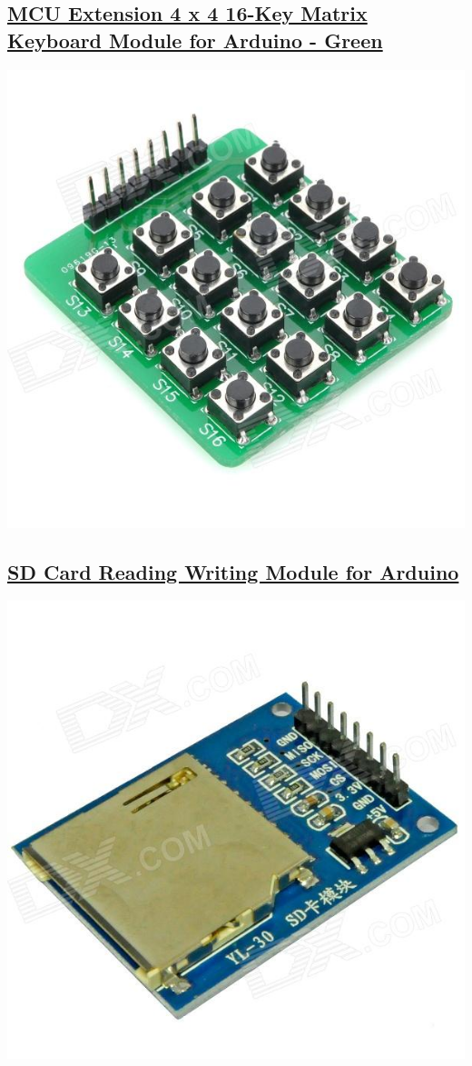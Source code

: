 \documentclass[11pt]{article}
\begin{document}
\subsection{\href{http://dx.com/p/mcu-extension-4-x-4-16-key-matrix-keyboard-module-for-arduino-green-147734}{MCU Extension 4 x 4 16-Key Matrix Keyboard Module for Arduino - Green}}
\label{sec-4-6}
\includegraphics[width=.9\linewidth]{./files/sku_147734_1.jpg}
\subsection{\href{http://dx.com/p/sd-card-reading-writing-module-for-arduino-148784}{SD Card Reading Writing Module for Arduino}}
\label{sec-4-7}
\includegraphics[width=.9\linewidth]{./files/sku_148784_1.jpg}
\end{document}
